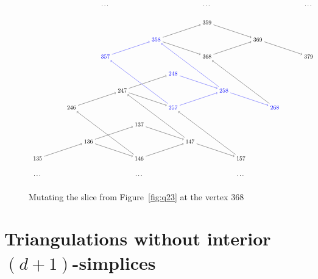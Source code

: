 \documentclass[ALCO,Unicode,published]{cedram}
\begin{document}
\begin{figure}
\caption{Mutating the slice from Figure~\ref{fig:q23} at the vertex 368}\label{fig:slice_mut}
\[
\scalebox{0.7}{
\begin{tikzpicture}


\node(zzcz) at (0,0){135};
\node(azbz) at (6,0){146};
\node(bzaz) at (12,0){157};
\node(zabz) at (3,1){136};
\node(aaaz) at (9,1){147};
\node(zbaz) at (6,2){137};

\node(zzca) at (2,3){246};
\node(azba) at (8,3){\color{blue}{257}};
\node(bzaa) at (14,3){\color{blue}{268}};
\node(zaba) at (5,4){247};
\node(aaaa) at (11,4){\color{blue}{258}};
\node(zbaa) at (8,5){\color{blue}{248}};

\node(zzcb) at (4,6){\color{blue}{357}};
\node(azbb) at (10,6){368};
\node(bzab) at (16,6){379};
\node(zabb) at (7,7){\color{blue}{358}};
\node(aaab) at (13,7){369};
\node(zbab) at (10,8){359};

\node at (0,-1){\dots};
\node at (6,-1){\dots};
\node at (12,-1){\dots};

\node at (4,9){\dots};
\node at (10,9){\dots};
\node at (16,9){\dots};


\draw[->] (zzcz) -- (zabz);
\draw[->] (zabz) -- (azbz);
\draw[->] (azbz) -- (aaaz);
\draw[->] (aaaz) -- (bzaz);
\draw[->] (zabz) -- (zbaz);
\draw[->] (zbaz) -- (aaaz);

\draw[->] (zzca) -- (zaba);
\draw[->] (zaba) -- (azba);
\draw[->,blue] (azba) -- (aaaa);
\draw[->,blue] (aaaa) -- (bzaa);
\draw[->] (zaba) -- (zbaa);
\draw[->,blue] (zbaa) -- (aaaa);

\draw[->,blue] (zzcb) -- (zabb);
\draw[->] (zabb) -- (azbb);
\draw[->] (azbb) -- (aaab);
\draw[->] (aaab) -- (bzab);
\draw[->] (zabb) -- (zbab);
\draw[->] (zbab) -- (aaab);

\draw[->] (azbz) -- (zzca);
\draw[->] (bzaz) -- (azba);
\draw[->] (aaaz) -- (zaba);

\draw[->,blue] (azba) -- (zzcb);
\draw[->] (bzaa) -- (azbb);
\draw[->,blue] (aaaa) -- (zabb);

\end{tikzpicture}
}
\]
\end{figure}

\section{Triangulations without interior $(d+1)$-simplices}\label{sect:triangs}
\end{document}
